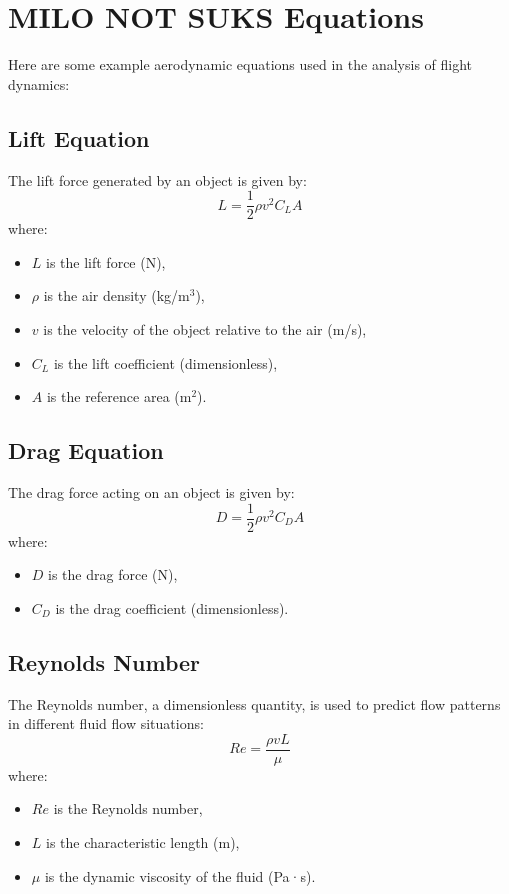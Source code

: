 \documentclass{article}
\begin{document}
\section{MILO NOT SUKS Equations}
Here are some example aerodynamic equations used in the analysis of flight dynamics:

\subsection{Lift Equation}
The lift force generated by an object is given by:
\begin{equation}
    L = \frac{1}{2} \rho v^2 C_L A
\end{equation}
where:
\begin{itemize}
    \item $L$ is the lift force (N),
    \item $\rho$ is the air density (kg/m\(^3\)),
    \item $v$ is the velocity of the object relative to the air (m/s),
    \item $C_L$ is the lift coefficient (dimensionless),
    \item $A$ is the reference area (m\(^2\)).
\end{itemize}

\subsection{Drag Equation}
The drag force acting on an object is given by:
\begin{equation}
    D = \frac{1}{2} \rho v^2 C_D A
\end{equation}
where:
\begin{itemize}
    \item $D$ is the drag force (N),
    \item $C_D$ is the drag coefficient (dimensionless).
\end{itemize}

\subsection{Reynolds Number}
The Reynolds number, a dimensionless quantity, is used to predict flow patterns in different fluid flow situations:
\begin{equation}
    Re = \frac{\rho v L}{\mu}
\end{equation}
where:
\begin{itemize}
    \item $Re$ is the Reynolds number,
    \item $L$ is the characteristic length (m),
    \item $\mu$ is the dynamic viscosity of the fluid (Pa·s).
\end{itemize}
\end{document}
